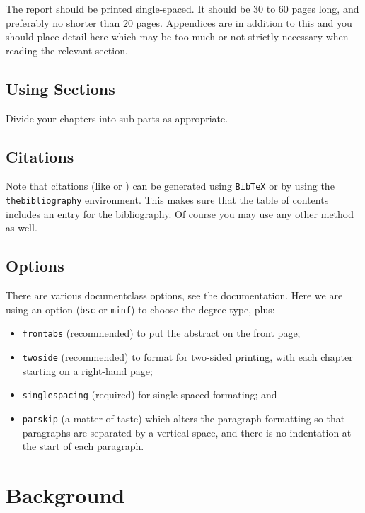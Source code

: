 \documentclass[bsc,frontabs,twoside,singlespacing,parskip,deptreport]{infthesis}
\theoremstyle{definition}
\begin{document}
The report should be printed single-spaced.
It should be 30 to 60 pages long, and preferably no shorter than 20 pages.
Appendices are in addition to this and you should place detail
here which may be too much or not strictly necessary when reading the relevant section.

\section{Using Sections}

Divide your chapters into sub-parts as appropriate.

\section{Citations}

Note that citations
(like \cite{P1} or \cite{P2})
can be generated using {\tt BibTeX} or by using the
{\tt thebibliography} environment. This makes sure that the
table of contents includes an entry for the bibliography.
Of course you may use any other method as well.

\section{Options}

There are various documentclass options, see the documentation.  Here we are
using an option ({\tt bsc} or {\tt minf}) to choose the degree type, plus:
\begin{itemize}
\item {\tt frontabs} (recommended) to put the abstract on the front page;
\item {\tt twoside} (recommended) to format for two-sided printing, with
  each chapter starting on a right-hand page;
\item {\tt singlespacing} (required) for single-spaced formating; and
\item {\tt parskip} (a matter of taste) which alters the paragraph formatting so that
paragraphs are separated by a vertical space, and there is no
indentation at the start of each paragraph.
\end{itemize}






\chapter{Background}
\end{document}

